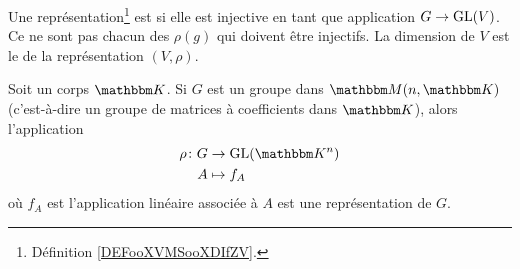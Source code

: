 \begin{definition}
    Une représentation\footnote{Définition \ref{DEFooXVMSooXDIfZV}.} est  si elle est injective en tant que application \( G\to \textup{GL}(V)\). Ce ne sont pas chacun des \( \rho(g)\) qui doivent être injectifs. La dimension de \( V\) est le  de la représentation \( (V,\rho)\).
\end{definition}

\begin{proposition}     \label{PROPooHNQOooSzeEFG}
    Soit un corps \( \eK\). Si \( G\) est un groupe dans \( \eM(n,\eK)\) (c'est-à-dire un groupe de matrices à coefficients dans \( \eK\)), alors l'application
    \begin{equation}
        \begin{aligned}
                \rho\colon G&\to \GL(\eK^n) \\
            A&\mapsto f_A 
        \end{aligned}
    \end{equation}
    où \( f_A\) est l'application linéaire associée à \( A\) est une représentation de \( G\).
\end{proposition}


